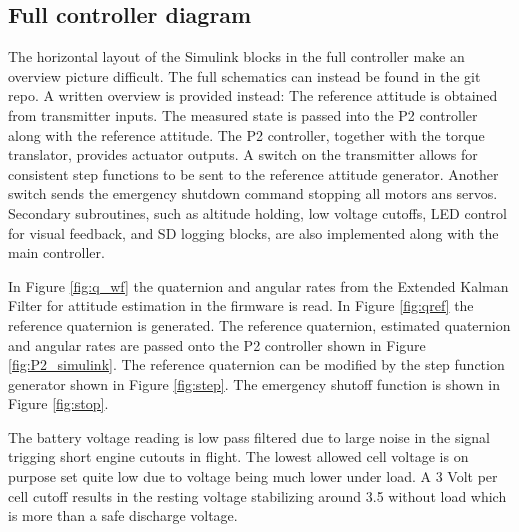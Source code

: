 \documentclass{article}
\begin{document}
\subsection{Full controller diagram}
The horizontal layout of the Simulink blocks in the full controller make an overview picture difficult.
The full schematics can instead be found in the git repo.\cite{mycode}
A written overview is provided instead:
The reference attitude is obtained from transmitter inputs.
The measured state is passed into the P2 controller along with the reference attitude.
The P2 controller, together with the torque translator, provides actuator outputs.
A switch on the transmitter allows for consistent step functions to be sent to the reference attitude generator.
Another switch sends the emergency shutdown command stopping all motors ans servos.
Secondary subroutines, such as altitude holding, low voltage cutoffs, LED control for visual feedback, and SD logging blocks, are also implemented along with the main controller.

In Figure \ref{fig:q_wf} the quaternion and angular rates from the Extended Kalman Filter for attitude estimation in the firmware is read.
In Figure \ref{fig:qref} the reference quaternion is generated.
The reference quaternion, estimated quaternion and angular rates are passed onto the P2 controller shown in Figure \ref{fig:P2_simulink}.
The reference quaternion can be modified by the step function generator shown in Figure \ref{fig:step}.
The emergency shutoff function is shown in Figure \ref{fig:stop}.

The battery voltage reading is low pass filtered due to large noise in the signal trigging short engine cutouts in flight.
The lowest allowed cell voltage is on purpose set quite low due to voltage being much lower under load.
A 3 Volt per cell cutoff results in the resting voltage stabilizing around 3.5 without load which is more than a safe discharge voltage.
\end{document}

